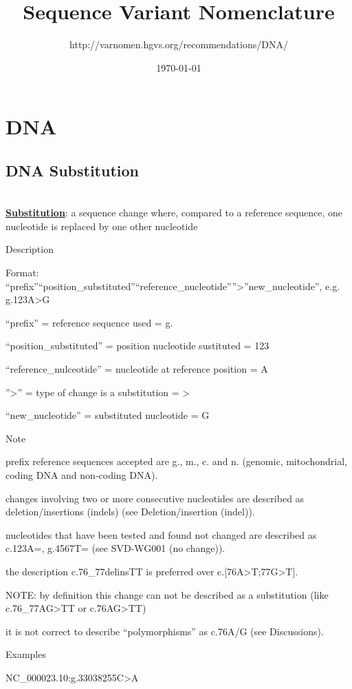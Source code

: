 \documentclass{book}
\title{Sequence Variant Nomenclature}
\date{\today}
\author{http://varnomen.hgvs.org/recommendations/DNA/}
\newcommand{\svdefinition}[2]{
	\noindent {
		\Large \textbf{Definitions}
	} \\ 
	\indent \textbf{\uline{#1}}: #2
}
\begin{document}
	\maketitle
	
	\chapter{DNA}
	
	\section{DNA Substitution}
	
	\svdefinition{Substitution}{a sequence change where, compared to a reference sequence, one nucleotide is replaced by one other nucleotide}
	
	Description

	Format: “prefix”“position\_substituted”“reference\_nucleotide””>”new\_nucleotide”, e.g. g.123A>G

	“prefix” = reference sequence used = g.

	“position\_substituted” = position nucleotide sustituted = 123

	“reference\_nulceotide” = nucleotide at reference position = A

	”>” = type of change is a substitution = >

	“new\_nucleotide” = substituted nucleotide = G

	

	Note

	prefix reference sequences accepted are g., m., c. and n. (genomic, mitochondrial, coding DNA and non-coding DNA).

	changes involving two or more consecutive nucleotides are described as deletion/insertions (indels) (see Deletion/insertion (indel)).

	nucleotides that have been tested and found not changed are described as c.123A=, g.4567T= (see SVD-WG001 (no change)).

	the description c.76\_77delinsTT is preferred over c.[76A>T;77G>T].

	NOTE: by definition this change can not be described as a substitution (like c.76\_77AG>TT or c.76AG>TT)

	it is not correct to describe “polymorphisms” as c.76A/G (see Discussions).

	

	

	Examples

	NC\_000023.10:g.33038255C>A
\end{document}
